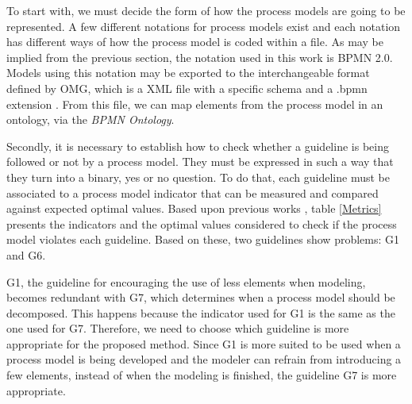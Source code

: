 \documentclass[a4paper,twoside]{article}
\begin{document}
To start with, we must decide the form of how the process models are going to be represented. A few different notations for process models exist and each notation has different ways of how the process model is coded within a file. As may be implied from the previous section, the notation used in this work is BPMN 2.0. Models using this notation may be exported to the interchangeable format defined by OMG, which is a XML file with a specific schema and a .bpmn extension \citep{OMGObjectManagementGroup2015}. From this file, we can map elements from the process model in an ontology, via the \textit{BPMN Ontology}.

Secondly, it is necessary to establish how to check whether a guideline is being followed or not by a process model. They must be expressed in such a way that they turn into a binary, yes or no question. To do that, each guideline must be associated to a process model indicator that can be measured and compared against expected optimal values. Based upon previous works \citep{Mendling2008,Recker2011,Mendling:2012}, table \ref{Metrics} presents the indicators and the optimal values considered to check if the process model violates each guideline. Based on these, two guidelines show problems: G1 and G6.


G1, the guideline for encouraging the use of less elements when modeling, becomes redundant with G7, which determines when a process model should be decomposed. This happens because the indicator used for G1 is the same as the one used for G7. Therefore, we need to choose which guideline is more appropriate for the proposed method. Since G1 is more suited to be used when a process model is being developed and the modeler can refrain from introducing a few elements, instead of when the modeling is finished, the guideline G7 is more appropriate.
\end{document}
